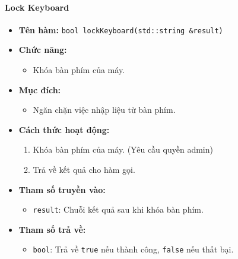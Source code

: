 \paragraph{Lock Keyboard}
\begin{itemize}
    \item \textbf{Tên hàm:} \texttt{bool lockKeyboard(std::string \&result)}
    \item \textbf{Chức năng:}
    \begin{itemize}
        \item Khóa bàn phím của máy.
    \end{itemize}
    \item \textbf{Mục đích:}
    \begin{itemize}
        \item Ngăn chặn việc nhập liệu từ bàn phím.
    \end{itemize}
    \item \textbf{Cách thức hoạt động:}
    \begin{enumerate}
        \item Khóa bàn phím của máy. (Yêu cầu quyền admin)
        \item Trả về kết quả cho hàm gọi.
    \end{enumerate}
    \item \textbf{Tham số truyền vào:}
    \begin{itemize}
        \item \texttt{result}: Chuỗi kết quả sau khi khóa bàn phím.
    \end{itemize}
    \item \textbf{Tham số trả về:}
    \begin{itemize}
        \item \texttt{bool}: Trả về \texttt{true} nếu thành công, \texttt{false} nếu thất bại.
    \end{itemize}
\end{itemize}

